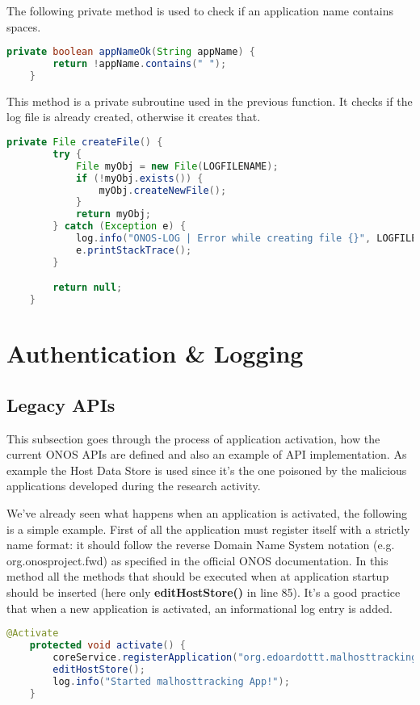 \documentclass[a4paper,10pt]{memoir}
\begin{document}
The following private method is used to check if an application name contains spaces.
\begin{lstlisting}[language=java,firstnumber=127]
    private boolean appNameOk(String appName) {
        return !appName.contains(" ");
    }
\end{lstlisting}

This method is a private subroutine used in the previous function. It checks if the log file is already created, otherwise it creates that.
\begin{lstlisting}[language=java,firstnumber=131]
    private File createFile() {
        try {
            File myObj = new File(LOGFILENAME);
            if (!myObj.exists()) {
                myObj.createNewFile();
            }
            return myObj;
        } catch (Exception e) {
            log.info("ONOS-LOG | Error while creating file {}", LOGFILENAME);
            e.printStackTrace();
        }

        return null;
    }
\end{lstlisting}

\clearpage

\section{Authentication \& Logging}

\subsection{Legacy APIs}
This subsection goes through the process of application activation, how the current ONOS APIs are defined and also an example of API implementation. As example the Host Data Store is used since it's the one poisoned by the malicious applications developed during the research activity.
\medskip

We've already seen what happens when an application is activated, the following is a simple example. First of all the application must register itself with a strictly name format: it should follow the reverse Domain Name System notation (e.g. org.onosproject.fwd) as specified in the official ONOS documentation. In this method all the methods that should be executed when at application startup should be inserted (here only \textbf{editHostStore()} in line 85). It's a good practice that when a new application is activated, an informational log entry is added.
\begin{lstlisting}[language=java,firstnumber=82]
    @Activate
    protected void activate() {
        coreService.registerApplication("org.edoardottt.malhosttracking.app")
        editHostStore();
        log.info("Started malhosttracking App!");
    }
\end{lstlisting}
\end{document}
